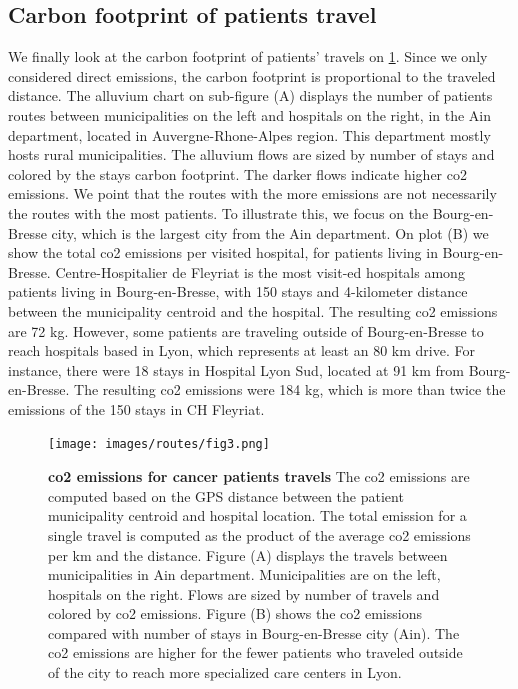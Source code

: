 \subsection{Carbon footprint of patients travel}

We finally look at the carbon footprint of patients' travels on
\cref{fig:routes-co2-emissions}. Since we only considered direct emissions, the
carbon footprint is proportional to the traveled distance. The alluvium chart on
sub-figure (A) displays the number of patients routes between municipalities on
the left and hospitals on the right, in the Ain department, located in
Auvergne-Rhone-Alpes region. This department mostly hosts rural municipalities.
The alluvium flows are sized by number of stays and colored by the stays carbon
footprint. The darker flows indicate higher \ac{co2} emissions. We point that
the routes with the more emissions are not necessarily the routes with the most
patients. To illustrate this, we focus on the Bourg-en-Bresse city, which is the
largest city from the Ain department. On plot (B) we show the total \ac{co2}
emissions per visited hospital, for patients living in Bourg-en-Bresse.
Centre-Hospitalier de Fleyriat is the most visit-ed hospitals among patients
living in Bourg-en-Bresse, with 150 stays and 4-kilometer distance between the
municipality centroid and the hospital. The resulting \ac{co2} emissions are 72
kg. However, some patients are traveling outside of Bourg-en-Bresse to reach
hospitals based in Lyon, which represents at least an 80 km drive. For instance,
there were 18 stays in Hospital Lyon Sud, located at 91 km from Bourg-en-Bresse.
The resulting \ac{co2} emissions were 184 kg, which is more than twice the
emissions of the 150 stays in CH Fleyriat.

\begin{figure}[H]
    \texttt{[image: images/routes/fig3.png]}
    \centering
    \caption{ \textbf{\ac{co2} emissions for cancer patients travels} The
        \ac{co2} emissions are computed based on the GPS distance between the
        patient municipality centroid and hospital location. The total emission
        for a single travel is computed as the product of the average \ac{co2}
        emissions per km and the distance. Figure (A) displays the travels
        between municipalities in Ain department. Municipalities are on the
        left, hospitals on the right. Flows are sized by number of travels and
        colored by \ac{co2} emissions. Figure (B) shows the \ac{co2} emissions
        compared with number of stays in Bourg-en-Bresse city (Ain). The
        \ac{co2} emissions are higher for the fewer patients who traveled
        outside of the city to reach more specialized care centers in Lyon. }
    \label{fig:routes-co2-emissions}
\end{figure}

